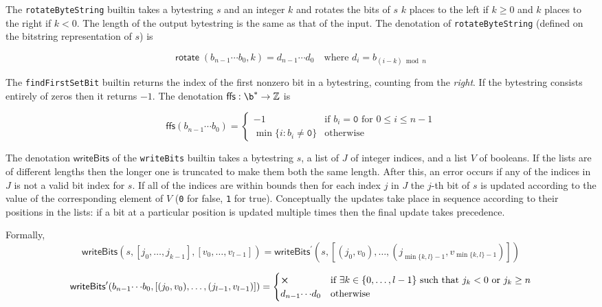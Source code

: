 \label{note:rotate}
The \texttt{rotateByteString} builtin takes a bytestring $s$ and an integer $k$
and rotates the bits of $s$ $k$ places to the left if $k \geq 0$ and $k$ places
to the right if $k < 0$.  The length of the output bytestring is the same as
that of the input.  The denotation of
\texttt{rotateByteString} (defined on the bitstring representation of $s$) is 

$$
\mathsf{rotate}\;(b_{n-1} \cdots b_0, k) = d_{n-1}\cdots d_0 \quad\text{where $d_i = b_{(i-k)\bmod n}$}
$$

\label{note:ffs}
The \texttt{findFirstSetBit} builtin returns the index of the first nonzero bit
in a bytestring, counting from the \textit{right}. If the bytestring consists
entirely of zeros then it returns $-1$.  The denotation
$\mathsf{ffs}: \b^* \rightarrow \Z$ is

$$
\mathsf{ffs}(b_{n-1}\cdots b_0) =
\begin{cases}
  -1 & \text{if $b_i = \mathtt{0}$ for $0 \leq i \leq n-1$}\\
  \min{\{i: b_i \ne \mathtt{0}\}} & \text{otherwise}
  \end{cases}
$$


\label{note:writebits}
The denotation $\mathsf{writeBits}$ of the \texttt{writeBits} builtin takes a
bytestring $s$, a list of $J$ of integer indices, and a list $V$ of booleans.
If the lists are of different lengths then the longer one is truncated to make
them both the same length.  After this, an error occurs if any of the indices in
$J$ is not a valid bit index for $s$.  If all of the indices are within bounds
then for each index $j$ in $J$ the $j$-th bit of $s$ is updated according to the
value of the corresponding element of $V$ (\texttt{0}
for \textsf{false}, \texttt{1} for \textsf{true}).  Conceptually the updates
take place in sequence according to their positions in the lists: if a bit at a
particular position is updated multiple times then the final update takes
precedence.

\smallskip
\noindent Formally, 
$$
\mathsf{writeBits}(s, [j_0 , \ldots, j_{k-1}], [v_0, \ldots, v_{l-1}]) =
    \mathsf{writeBits}^{\prime} (s, [(j_0, v_0) , \ldots, (j_{\min\{k,l\}-1}, v_{\min\{k,l\}-1})])
$$

$$
\mathsf{writeBits}^{\prime}(b_{n-1}{\cdots}b_0, [(j_0,v_0), \ldots, (j_{l-1}, v_{l-1})]) = 
\begin{cases}
\errorX & \text{if $\exists k \in \{0, \ldots, l-1\}$ such that $j_k<0$ or $j_k \geq n$} \\
d_{n-1}{\cdots}d_0 & \text{otherwise}
\end{cases}
$$

